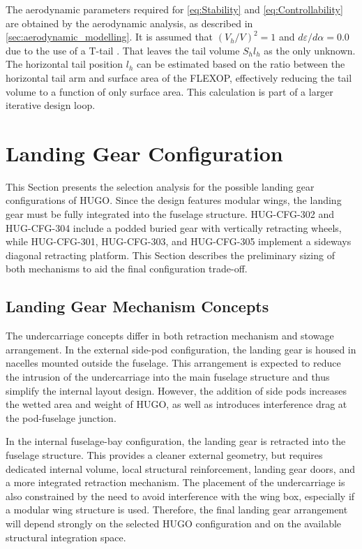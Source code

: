The aerodynamic parameters required for \autoref{eq:Stability} and \autoref{eq:Controllability} are obtained by the aerodynamic analysis, as described in \autoref{sec:aerodynamic_modelling}. It is assumed that $({V_h}/{V})^2=1$ and ${d\varepsilon}/{d\alpha}=0.0$ due to the use of a T-tail \cite{torenbeek2013synthesis}. That leaves the tail volume $S_h l_h$ as the only unknown. The horizontal tail position $l_h$ can be estimated based on the ratio between the horizontal tail arm and surface area of the FLEXOP, effectively reducing the tail volume to a function of only surface area. This calculation is part of a larger iterative design loop.



\section{Landing Gear Configuration}
\label{sec:Landing_gear_config}

This Section presents the selection analysis for the possible landing gear configurations of HUGO. Since the design features modular wings, the landing gear must be fully integrated into the fuselage structure. HUG-CFG-302 and HUG-CFG-304 include a podded buried gear with vertically retracting wheels, while HUG-CFG-301, HUG-CFG-303, and HUG-CFG-305 implement a sideways diagonal retracting platform. This Section describes the preliminary sizing of both mechanisms to aid the final configuration trade-off.


\subsection{Landing Gear Mechanism Concepts}
\label{sub:landing_gear_mechanisms}

The undercarriage concepts differ in both retraction mechanism and stowage arrangement. In the external side-pod configuration, the landing gear is housed in nacelles mounted outside the fuselage. This arrangement is expected to reduce the intrusion of the undercarriage into the main fuselage structure and thus simplify the internal layout design. However, the addition of side pods increases the wetted area and weight of HUGO, as well as introduces interference drag at the pod-fuselage junction.

In the internal fuselage-bay configuration, the landing gear is retracted into the fuselage structure. This provides a cleaner external geometry, but requires dedicated internal volume, local structural reinforcement, landing gear doors, and a more integrated retraction mechanism. The placement of the undercarriage is also constrained by the need to avoid interference with the wing box, especially if a modular wing structure is used. Therefore, the final landing gear arrangement will depend strongly on the selected HUGO configuration and on the available structural integration space.

